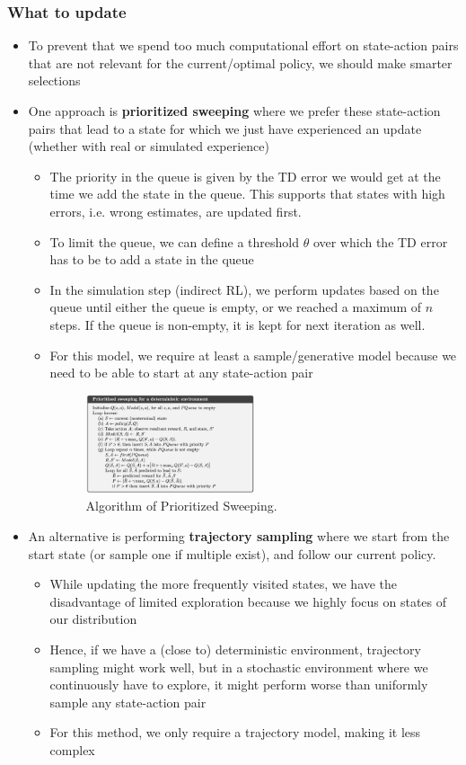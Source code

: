 \subsubsection{What to update}
\begin{itemize}
	\item To prevent that we spend too much computational effort on state-action pairs that are not relevant for the current/optimal policy, we should make smarter selections
	\item One approach is \textbf{prioritized sweeping} where we prefer these state-action pairs that lead to a state for which we just have experienced an update (whether with real or simulated experience)
	\begin{itemize}
		\item The priority in the queue is given by the TD error we would get at the time we add the state in the queue. This supports that states with high errors, i.e. wrong estimates, are updated first.
		\item To limit the queue, we can define a threshold $\theta$ over which the TD error has to be to add a state in the queue
		\item In the simulation step (indirect RL), we perform updates based on the queue until either the queue is empty, or we reached a maximum of $n$ steps. If the queue is non-empty, it is kept for next iteration as well.
		\item For this model, we require at least a sample/generative model because we need to be able to start at any state-action pair
		\begin{figure}[ht!]
			\centering
			\includegraphics[width=0.5\textwidth]{figures/rl_model_based_dyna_prioritized_sweeping.png}
			\caption{Algorithm of Prioritized Sweeping.}
		\end{figure}
	\end{itemize}
	\item An alternative is performing \textbf{trajectory sampling} where we start from the start state (or sample one if multiple exist), and follow our current policy. 
	\begin{itemize}
		\item While updating the more frequently visited states, we have the disadvantage of limited exploration because we highly focus on states of our distribution
		\item Hence, if we have a (close to) deterministic environment, trajectory sampling might work well, but in a stochastic environment where we continuously have to explore, it might perform worse than uniformly sample any state-action pair 
		\item For this method, we only require a trajectory model, making it less complex
	\end{itemize}
\end{itemize}
